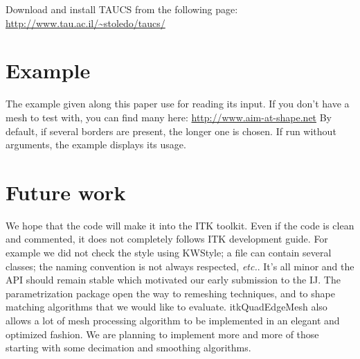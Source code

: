 \documentclass{InsightArticle}
\begin{document}

Download and install TAUCS from the following page:
\url{http://www.tau.ac.il/~stoledo/taucs/}


\section{Example}
The example given along this paper use  for reading its input. If you don't have a mesh to test with, you can find many here:
\url{http://www.aim-at-shape.net}
By default, if several borders are present, the longer one is chosen. If run without arguments, the example displays its usage.

\section{Future work}

We hope that the code will make it into the ITK toolkit. Even if the code is clean and commented, it does not completely follows ITK development guide. For example we did not check the style using KWStyle; a file can contain several classes; the naming convention is not always respected, \textit{etc.}. It's all minor and the API should remain stable which motivated our early submission to the IJ.
The parametrization package open the way to remeshing techniques, and to shape matching algorithms that we would like to evaluate.
itkQuadEdgeMesh also allows a lot of mesh processing algorithm to be implemented in an elegant and optimized fashion. We are planning to implement more and more of those starting with some decimation and smoothing algorithms.


%
%
\end{document}

